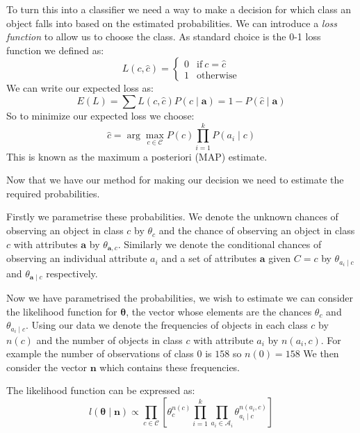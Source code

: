 To turn this into a classifier we need a way to make a decision for which class an object falls into based on the estimated probabilities.
We can introduce a \textit{loss function} to allow us to choose the class.
As standard choice is the 0-1 loss function we defined as:
\begin{equation}
	L(c, \hat{c}) = 
	\begin{cases}
		0 & \text{if}\ c = \hat{c} \\
		1 & \text{otherwise}
	\end{cases}
\end{equation}
We can write our expected loss as:
\begin{equation}
	E(L) = \sum L(c, \hat{c})P(c \mid \mathbf{a}) = 1 - P(\hat{c} \mid \mathbf{a})
\end{equation}
So to minimize our expected loss we choose:
\begin{equation} \label{mle_estimate}
	\hat c = \arg\max_{c \in \mathcal{C}} P(c)\prod_{i=1}^{k}P(a_i \mid c)
\end{equation}
This is known as the maximum a posteriori (MAP) estimate.

Now that we have our method for making our decision we need to estimate the required probabilities.

Firstly we parametrise these probabilities.
We denote the unknown chances of observing an object in class $c$ by $\theta_c$ and the chance of observing an object in class $c$ with attributes $\mathbf{a}$ by $\theta_{\mathbf{a}, c}$.
Similarly we denote the conditional chances of observing an individual attribute $a_i$ and a set of attributes $\mathbf{a}$ given $C=c$ by $\theta_{a_i \mid c}$ and $\theta_{\mathbf{a} \mid c}$ respectively.

Now we have parametrised the probabilities, we wish to estimate we can consider the likelihood function for $\mathbf{\theta}$, the vector whose elements are the chances $\theta_{c}$ and $\theta_{a_i \mid c}$.
Using our data we denote the frequencies of objects in each class $c$ by $n(c)$ and the number of objects in class $c$ with attribute $a_i$ by $n(a_i, c)$.
For example the number of observations of class $0$ is $158$ so $n(0) = 158$
We then consider the vector $\mathbf{n}$ which contains these frequencies.

The likelihood function can be expressed as:
\begin{equation} \label{likelihood}
	l(\mathbf{\theta} \mid \mathbf{n}) \propto \prod_{c \in \mathcal{C}} \left[ \theta_c^{n(c)} \prod_{i=1}^k \prod_{a_i \in \mathcal{A}_i} \theta_{a_i \mid c}^{n(a_i, c)} \right]
\end{equation}


